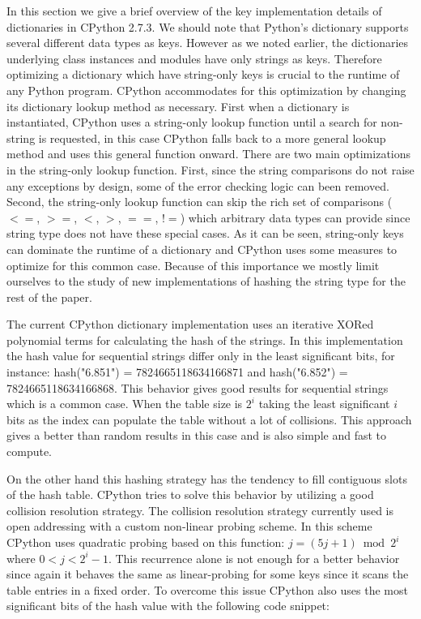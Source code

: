 \documentclass[11pt]{article}
\begin{document}
In this section we give a brief overview of the key implementation details of
dictionaries in CPython 2.7.3.  We should note that Python’s dictionary supports
several different data types as keys. However as we noted earlier, the
dictionaries underlying class instances and modules have only strings as keys.
Therefore optimizing a dictionary which have string-only keys is crucial to the
runtime of any Python program. CPython accommodates for this optimization by
changing its dictionary lookup method as necessary. First when a dictionary is
instantiated, CPython uses a string-only lookup function until a search for
non-string is requested, in this case CPython falls back to a more general
lookup method and uses this general function onward. There are two main
optimizations in the string-only lookup function.  First, since the string
comparisons do not raise any exceptions by design, some of the error checking
logic can been removed. Second, the string-only lookup function can skip the
rich set of comparisons ( $<=$, $>=$, $<$, $>$, $==$, $!=$) which arbitrary data
types can provide since string type does not have these special cases.  As it
can be seen, string-only keys can dominate the runtime of a dictionary and
CPython uses some measures to optimize for this common case. Because of this
importance we mostly limit ourselves to the study of new implementations of
hashing the string type for the rest of the paper.

The current CPython dictionary implementation uses an iterative XORed polynomial
terms for calculating the hash of the strings. In this implementation the hash
value for sequential strings differ only in the least significant bits, for
instance: hash("6.851") = 7824665118634166871 and hash("6.852") =
7824665118634166868. This behavior gives good results for sequential strings
which is a common case. When the table size is $2^i$ taking the least
significant $i$ bits as the index can populate the table without a lot of
collisions. This approach gives a better than random results in this case and is
also simple and fast to compute.

On the other hand this hashing strategy has the tendency to fill contiguous
slots of the hash table. CPython tries to solve this behavior by utilizing a
good collision resolution strategy. The collision resolution strategy currently
used is open addressing with a custom non-linear probing scheme. In this scheme
CPython uses quadratic probing based on this function: $j = (5j + 1) \bmod 2^i$
where $0<j<2^i-1$. This recurrence alone is not enough for a better behavior
since again it behaves the same as linear-probing for some keys since it scans
the table entries in a fixed order. To overcome this issue CPython also uses the
most significant bits of the hash value with the following code snippet:
\end{document}
